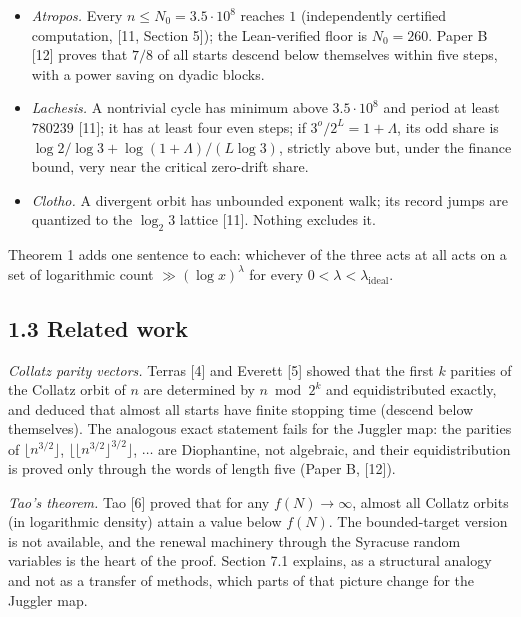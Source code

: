 \documentclass[11pt,a4paper]{article}
\providecommand{\tightlist}{\setlength{\itemsep}{0pt}\setlength{\parskip}{0pt}}
\begin{document}
\begin{itemize}
\tightlist
\item
  \emph{Atropos.} Every \(n\le N_0=3.5\cdot 10^8\) reaches \(1\)
  (independently certified computation, {[}11, Section 5{]}); the
  Lean-verified floor is \(N_0=260\). Paper B {[}12{]} proves that
  \(7/8\) of all starts descend below themselves within five steps, with
  a power saving on dyadic blocks.
\item
  \emph{Lachesis.} A nontrivial cycle has minimum above
  \(3.5\cdot 10^8\) and period at least \(780239\) {[}11{]}; it has at
  least four even steps; if \(3^o/2^L=1+\Lambda\), its odd share is
  \(\log 2/\log 3+\log(1+\Lambda)/(L\log3)\), strictly above but, under
  the finance bound, very near the critical zero-drift share.
\item
  \emph{Clotho.} A divergent orbit has unbounded exponent walk; its
  record jumps are quantized to the \(\log_2 3\) lattice {[}11{]}.
  Nothing excludes it.
\end{itemize}

Theorem 1 adds one sentence to each: whichever of the three acts at all
acts on a set of logarithmic count \(\gg(\log x)^\lambda\) for every
\(0<\lambda<\lambda_{\mathrm{ideal}}\).

\subsection{1.3 Related work}\label{related-work}

\emph{Collatz parity vectors.} Terras {[}4{]} and Everett {[}5{]} showed
that the first \(k\) parities of the Collatz orbit of \(n\) are
determined by \(n\bmod 2^k\) and equidistributed exactly, and deduced
that almost all starts have finite stopping time (descend below
themselves). The analogous exact statement fails for the Juggler map:
the parities of \(\lfloor n^{3/2}\rfloor\),
\(\lfloor\lfloor n^{3/2}\rfloor^{3/2}\rfloor\), \(\dots\) are
Diophantine, not algebraic, and their equidistribution is proved only
through the words of length five (Paper B, {[}12{]}).

\emph{Tao's theorem.} Tao {[}6{]} proved that for any \(f(N)\to\infty\),
almost all Collatz orbits (in logarithmic density) attain a value below
\(f(N)\). The bounded-target version is not available, and the renewal
machinery through the Syracuse random variables is the heart of the
proof. Section 7.1 explains, as a structural analogy and not as a
transfer of methods, which parts of that picture change for the Juggler
map.
\end{document}
